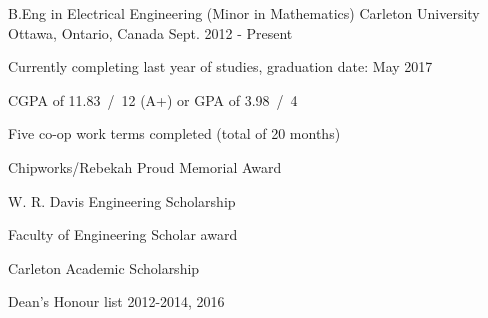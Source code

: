 

\begin{cventries}

  \cventry
    {B.Eng in Electrical Engineering (Minor in Mathematics)} %
    {Carleton University} %
    {Ottawa, Ontario, Canada} %
    {Sept. 2012 - Present} %
    {
      \begin{cvitems} %
        \item {Currently completing last year of studies, graduation date: May 2017}
        \item {CGPA of 11.83~/~12 (A+) or GPA of 3.98~/~4}
        \item {Five co-op work terms completed (total of 20 months)}
        \item {Chipworks/Rebekah Proud Memorial Award}
        \item {W. R. Davis Engineering Scholarship}
        \item {Faculty of Engineering Scholar award}
        \item {Carleton Academic Scholarship}
        \item {Dean's Honour list 2012-2014, 2016}
      \end{cvitems}
    }

\end{cventries}
